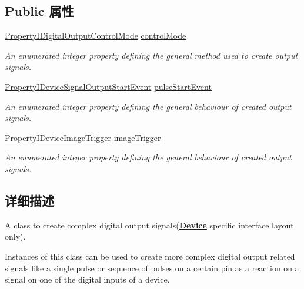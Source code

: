 \subsection*{Public 属性}
\begin{DoxyCompactItemize}
\item 
\hyperlink{group___device_specific_interface_ga00cd9778dbab384a83457d98ff8c3d97}{Property\+I\+Digital\+Output\+Control\+Mode} \hyperlink{classmv_i_m_p_a_c_t_1_1acquire_1_1_output_signal_generator_frame_grabber_a16a2f8eea50086e015adb7e40088e765}{control\+Mode}
\begin{DoxyCompactList}\small\item\em An enumerated integer property defining the general method used to create output signals. \end{DoxyCompactList}\item 
\hyperlink{group___device_specific_interface_ga63bede647f87c0203f196d9002ffac9e}{Property\+I\+Device\+Signal\+Output\+Start\+Event} \hyperlink{classmv_i_m_p_a_c_t_1_1acquire_1_1_output_signal_generator_frame_grabber_aa2102a162653d84112dcebbd90086ad4}{pulse\+Start\+Event}
\begin{DoxyCompactList}\small\item\em An enumerated integer property defining the general behaviour of created output signals. \end{DoxyCompactList}\item 
\hyperlink{group___device_specific_interface_ga0a157bd269e0e43d0d944d3f9615f770}{Property\+I\+Device\+Image\+Trigger} \hyperlink{classmv_i_m_p_a_c_t_1_1acquire_1_1_output_signal_generator_frame_grabber_a7b84a665907ea8d08f8dbf0be76f8388}{image\+Trigger}
\begin{DoxyCompactList}\small\item\em An enumerated integer property defining the general behaviour of created output signals. \end{DoxyCompactList}\end{DoxyCompactItemize}


\subsection{详细描述}
A class to create complex digital output signals({\bfseries \hyperlink{classmv_i_m_p_a_c_t_1_1acquire_1_1_device}{Device}} specific interface layout only). 

Instances of this class can be used to create more complex digital output related signals like a single pulse or sequence of pulses on a certain pin as a reaction on a signal on one of the digital inputs of a device.

